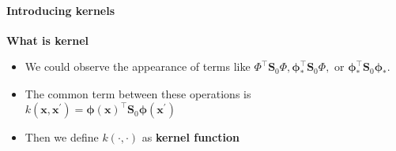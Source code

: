 \begin{frame}{\insertsubsection}
    \framesubtitle{Introducing kernels}

    \textcolor{UniGold}{\textbf{What is kernel}}
    \begin{itemize}
        \item We could observe the appearance of terms like $\Phi^{\top} \mathbf{S}_0 \Phi, \boldsymbol{\phi}_{*}^{\top} \mathbf{S}_0 \Phi, \text { or } \boldsymbol{\phi}_{*}^{\top} \mathbf{S}_0 \boldsymbol{\phi}_{*}$.
        \item The common term between these operations is $k(\mathbf{x},\mathbf{x^{\prime}}) = \boldsymbol{\phi}(\mathbf{x})^{\top} \mathbf{S}_0 \boldsymbol{\phi}\left(\mathbf{x}^{\prime}\right)$
        \item Then we define $k(\cdot,\cdot)$ as \textcolor{UniOrange}{\textbf{kernel function}}
        
    \end{itemize}
    
\end{frame}